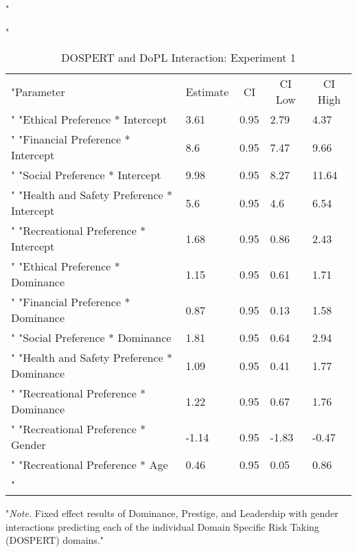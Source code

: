 \documentclass[
"  donotrepeattitle,doc, 12pt, a4paper,floatsintext]{apa7}"
\begin{document}
\begin{table}[h]
\begin{center}
\begin{threeparttable}
"\caption{\label{tab:m1_int_fixef_exp_1}DOSPERT and DoPL Interaction: Experiment 1}"
\begin{tabular}{lllll}
\toprule
"Parameter & \multicolumn{1}{c}{Estimate} & \multicolumn{1}{c}{CI} & \multicolumn{1}{c}{CI Low} & \multicolumn{1}{c}{CI High}\\"
\midrule
"Ethical Preference * Intercept & 3.61 & 0.95 & 2.79 & 4.37\\"
"Financial Preference * Intercept & 8.6 & 0.95 & 7.47 & 9.66\\"
"Social Preference * Intercept & 9.98 & 0.95 & 8.27 & 11.64\\"
"Health and Safety Preference * Intercept & 5.6 & 0.95 & 4.6 & 6.54\\"
"Recreational Preference * Intercept & 1.68 & 0.95 & 0.86 & 2.43\\"
"Ethical Preference * Dominance & 1.15 & 0.95 & 0.61 & 1.71\\"
"Financial Preference * Dominance & 0.87 & 0.95 & 0.13 & 1.58\\"
"Social Preference * Dominance & 1.81 & 0.95 & 0.64 & 2.94\\"
"Health and Safety Preference * Dominance & 1.09 & 0.95 & 0.41 & 1.77\\"
"Recreational Preference * Dominance & 1.22 & 0.95 & 0.67 & 1.76\\"
"Recreational Preference * Gender & -1.14 & 0.95 & -1.83 & -0.47\\"
"Recreational Preference * Age & 0.46 & 0.95 & 0.05 & 0.86\\"
\bottomrule
\addlinespace
\end{tabular}
\begin{tablenotes}[para]
"\normalsize{\textit{Note.} Fixed effect results of Dominance, Prestige, and Leadership with gender interactions predicting each of the individual Domain Specific Risk Taking (DOSPERT) domains.}"
\end{tablenotes}
\end{threeparttable}
\end{center}
\end{table}
\end{document}
